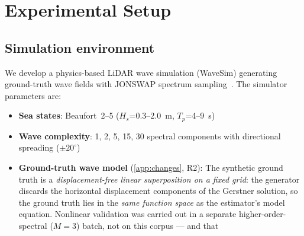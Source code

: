 \documentclass[review]{elsarticle}
\begin{document}
\section{Experimental Setup}
\label{sec:experiments}

\subsection{Simulation environment}

We develop a physics-based LiDAR wave simulation (WaveSim) generating
ground-truth wave fields with JONSWAP spectrum
sampling~\citep{hasselmann1973}.  The simulator parameters are:
\begin{itemize}
  \item \textbf{Sea states}: Beaufort~2--5
    ($H_s$=0.3--2.0~m, $T_p$=4--9~s)
  \item \textbf{Wave complexity}: 1, 2, 5, 15, 30 spectral components
    with directional spreading ($\pm 20^\circ$)
  \item \textbf{Ground-truth wave model} (\ref{app:changes}, R2): The synthetic ground truth is a \emph{displacement-free
    linear superposition on a fixed grid}: the generator discards the
    horizontal displacement components of the Gerstner solution, so the
    ground truth lies in the \emph{same function space} as the estimator's
    model equation. Nonlinear validation was carried out in a separate
    higher-order-spectral ($M{=}3$) batch, not on this corpus --- and that

\end{itemize}
\end{document}
